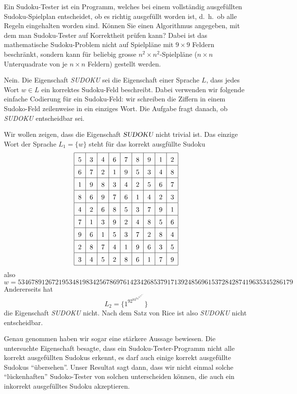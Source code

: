 Ein Sudoku-Tester ist ein Programm, welches bei einem vollständig
ausgefüllten Sudoku-Spielplan entscheidet, ob es richtig ausgefüllt
worden ist, d.~h.~ob alle Regeln eingehalten worden sind. Können Sie
einen Algorithmus angegeben, mit dem man Sudoku-Tester auf Korrektheit
prüfen kann? Dabei ist das mathematische Sudoku-Problem nicht auf
Spielpläne mit $9\times 9$ Feldern beschränkt,
sondern kann für beliebig grosse
$n^2\times n^2$-Spielpläne ($n\times n$ Unterquadrate von je $n\times n$
Feldern) gestellt werden.

\begin{loesung}
Nein.  Die Eigenschaft \textsl{SUDOKU} sei die Eigenschaft einer
Sprache $L$, dass jedes Wort $w\in L$ ein korrektes Sudoku-Feld
beschreibt. Dabei verwenden wir folgende einfache
Codierung für ein Sudoku-Feld: wir schreiben die Ziffern in
einem Sudoko-Feld zeilenweise in ein einziges Wort.
Die Aufgabe fragt danach, ob \textsl{SUDOKU} entscheidbar sei.

Wir wollen zeigen, dass die
Eigenschaft $\textsl{SUDOKU}$ nicht trivial ist.
Das einzige Wort der Sprache $L_1=\{w\}$  steht für das korrekt
ausgfüllte Sudoku
\[
\begin{tabular}{|c|c|c|c|c|c|c|c|c|}
\hline
\raisebox{0pt}[13pt][5pt]{5}&3&4&6&7&8&9&1&2\\
\hline
\raisebox{0pt}[13pt][5pt]{6}&7&2&1&9&5&3&4&8\\
\hline
\raisebox{0pt}[13pt][5pt]{1}&9&8&3&4&2&5&6&7\\
\hline
\raisebox{0pt}[13pt][5pt]{8}&6&9&7&6&1&4&2&3\\
\hline
\raisebox{0pt}[13pt][5pt]{4}&2&6&8&5&3&7&9&1\\
\hline
\raisebox{0pt}[13pt][5pt]{7}&1&3&9&2&4&8&5&6\\
\hline
\raisebox{0pt}[13pt][5pt]{9}&6&1&5&3&7&2&8&4\\
\hline
\raisebox{0pt}[13pt][5pt]{2}&8&7&4&1&9&6&3&5\\
\hline
\raisebox{0pt}[13pt][5pt]{3}&4&5&2&8&6&1&7&9\\
\hline
\end{tabular}
\]
also
\[
w=
534678912672195348198342567869761423426853791713924856961537284287419635345286179
\]
Andererseits hat
\[
L_2=\{1^92^93^94^95^96^97^98^99^9\}
\]
die Eigenschaft \textsl{SUDOKU} nicht. Nach dem Satz
von Rice ist also \textsl{SUDOKU} nicht entscheidbar.

Genau genommen haben wir sogar eine stärkere Aussage bewiesen.
Die untersuchte Eigenschaft besagte, dass ein Sudoku-Tester-Programm nicht
alle korrekt ausgefüllten Sudokus erkennt, es darf auch einige
korrekt ausgefüllte Sudokus ``übersehen''. Unser Resultat sagt dann,
dass wir nicht einmal solche ``lückenhaften'' Sudoko-Tester von solchen
unterscheiden können, die auch ein inkorrekt ausgefülltes Sudoku
akzeptieren.
\end{loesung}
